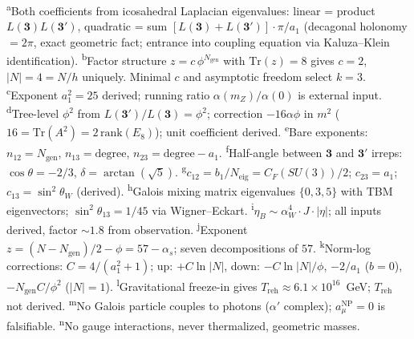 \documentclass[12pt,a4paper]{article}
\theoremstyle{definition}
\begin{document}
\begin{table}[H]
{\textsuperscript{a}Both coefficients from icosahedral Laplacian eigenvalues: linear = product $L(\mathbf{3})L(\mathbf{3'})$, quadratic = sum $[L(\mathbf{3})\!+\!L(\mathbf{3'})]\cdot\pi/a_1$ (decagonal holonomy $= 2\pi$, exact geometric fact; entrance into coupling equation via Kaluza--Klein identification). \newline
\textsuperscript{b}Factor structure $z = c\,\phi^{N_{\text{gen}}}$ with $\text{Tr}(z) = 8$ gives $c = 2$, $|N| = 4 = N/h$ uniquely.  Minimal $c$ and asymptotic freedom select $k = 3$. \newline
\textsuperscript{c}Exponent $a_1^2 = 25$ derived; running ratio $\alpha(m_Z)/\alpha(0)$ is external input. \newline
\textsuperscript{d}Tree-level $\phi^2$ from $L(\mathbf{3'})/L(\mathbf{3}) = \phi^2$; correction $-16\alpha\phi$ in $m^2$ ($16 = \text{Tr}(A^2) = 2\,\text{rank}(E_8)$); unit coefficient derived. \newline
\textsuperscript{e}Bare exponents: $n_{12} = N_{\text{gen}}$, $n_{13} = \text{degree}$, $n_{23} = \text{degree} - a_1$. \newline
\textsuperscript{f}Half-angle between $\mathbf{3}$ and $\mathbf{3'}$ irreps: $\cos\theta = -2/3$, $\delta = \arctan(\sqrt{5})$. \newline
\textsuperscript{g}$c_{12} = b_1/N_{\text{eig}} = C_F(SU(3))/2$; $c_{23} = a_1$; $c_{13} = \sin^2\theta_W$ (derived). \newline
\textsuperscript{h}Galois mixing matrix eigenvalues $\{0, 3, 5\}$ with TBM eigenvectors; $\sin^2\theta_{13} = 1/45$ via Wigner--Eckart. \newline
\textsuperscript{i}$\eta_B \sim \alpha_W^4 \cdot J \cdot |\eta|$; all inputs derived, factor $\sim 1.8$ from observation. \newline
\textsuperscript{j}Exponent $z = (N-N_{\text{gen}})/2 - \phi = 57 - \alpha_s$; seven decompositions of $57$. \newline
\textsuperscript{k}Norm-log corrections: $C = 4/(a_1^2+1)$; up: $+C\ln|N|$, down: $-C\ln|N|/\phi$, $-2/a_1$ ($b=0$), $-N_{\text{gen}}C/\phi^2$ ($|N|=1$). \newline
\textsuperscript{l}Gravitational freeze-in gives $T_{\text{reh}} \approx 6.1 \times 10^{16}$~GeV; $T_{\text{reh}}$ not derived. \newline
\textsuperscript{m}No Galois particle couples to photons ($\alpha'$ complex); $a_\mu^{\text{NP}} = 0$ is falsifiable. \newline
\textsuperscript{n}No gauge interactions, never thermalized, geometric masses. \newline
}
\end{table}
\end{document}
